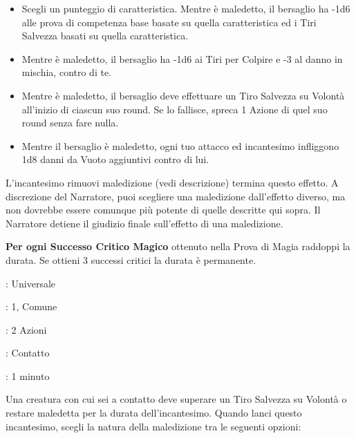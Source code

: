 \begin{multicols}{2}
\begin{itemize}[leftmargin=*] \setlength{\itemsep}{0pt}
	\item Scegli un punteggio di caratteristica. Mentre è maledetto, il bersaglio ha -1d6 alle prova di competenza base basate su quella caratteristica ed i Tiri Salvezza basati su quella caratteristica.
	\item Mentre è maledetto, il bersaglio ha -1d6 ai Tiri per Colpire e -3 al danno in mischia, contro di te.
	\item Mentre è maledetto, il bersaglio deve effettuare un Tiro Salvezza su Volontà all'inizio di ciascun suo round. Se lo fallisce, spreca 1 Azione di quel suo round senza fare nulla.
	\item Mentre il bersaglio è maledetto, ogni tuo attacco ed incantesimo infliggono 1d8 danni da Vuoto aggiuntivi contro di lui.
\end{itemize}

L'incantesimo rimuovi maledizione (vedi descrizione) termina questo effetto. A discrezione del Narratore, puoi scegliere una maledizione dall'effetto diverso, ma non dovrebbe essere comunque più potente di quelle descritte qui sopra. Il Narratore detiene il giudizio finale sull'effetto di una maledizione.

\textbf{Per ogni Successo Critico Magico} ottenuto nella Prova di Magia raddoppi la durata. Se ottieni 3 successi critici la durata è permanente.

\noindent\colorbox{OBSSgold!10}{
\begin{minipage}{0.95\linewidth}
\begin{description}[noitemsep, topsep=0pt, parsep=0pt, partopsep=0pt, leftmargin=0cm, labelwidth=1.3cm]
	\item[\textbf{Lista}]: Universale
	\item[\textbf{Livello}]: 1, Comune
	\item[\textbf{Lancio}]: 2 Azioni
	\item[\textbf{Gittata}]: Contatto
	\item[\textbf{Durata}]: 1 minuto
\end{description}
\end{minipage}}\smallskip

Una creatura con cui sei a contatto deve superare un Tiro Salvezza su Volontà o restare maledetta per la durata dell'incantesimo. Quando lanci questo incantesimo, scegli la natura della maledizione tra le seguenti opzioni:


\end{multicols}
